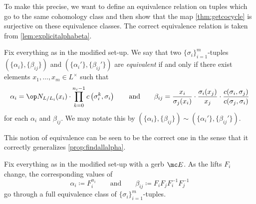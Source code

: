\documentclass{article}
\numberwithin{equation}{section}
\begin{document}
To make this precise, we want to define an equivalence relation on tuples which go to the same cohomology class and then show that the map \autoref{thm:getcocycle} is surjective on these equivalence classes. The correct equivalence relation is taken from \autoref{lem:explicitalphabeta}.
\begin{definition}
	Fix everything as in the modified set-up. We say that two $\{\sigma_i\}_{i=1}^m$-tuples $(\{\alpha_i\},\{\beta_{ij}\})$ and $(\{\alpha_i'\},\{\beta_{ij}'\})$ are \textit{equivalent} if and only if there exist elements $x_1,\ldots,x_m\in L^\times$ such that
	\[\alpha_i=\op N_{L/L_i}(x_i)\cdot\prod_{k=0}^{n_i-1}c\left(\sigma_i^k,\sigma_i\right)\qquad\text{and}\qquad\beta_{ij}=\frac{x_i}{\sigma_j(x_i)}\cdot\frac{\sigma_i(x_j)}{x_j}\cdot\frac{c(\sigma_i,\sigma_j)}{c(\sigma_j,\sigma_i)}\]
	for each $\alpha_i$ and $\beta_{ij}$. We may notate this by $(\{\alpha_i\},\{\beta_{ij}\})\sim(\{\alpha_i'\},\{\beta_{ij}'\})$.
\end{definition}
This notion of equivalence can be seen to be the correct one in the sense that it correctly generalizes \autoref{prop:findallalpha}.
\begin{proposition} \label{prop:gerbmakesaclass}
	Fix everything as in the modified set-up with a gerb $\mc E$. As the lifts $F_i$ change, the corresponding values of
	\[\alpha_i\coloneqq F_i^{n_i}\qquad\text{and}\qquad\beta_{ij}\coloneqq F_iF_jF_i^{-1}F_j^{-1}\]
	go through a full equivalence class of $\{\sigma_i\}_{i=1}^m$-tuples.
\end{proposition}
\end{document}
